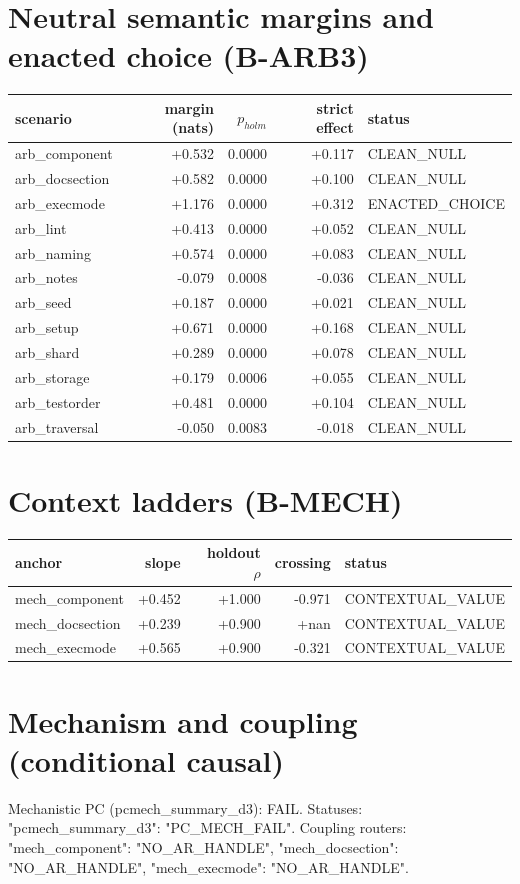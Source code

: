 \documentclass[10pt]{article}
\begin{document}
\section*{Neutral semantic margins and enacted choice (B-ARB3)}
\begin{tabular}{lrrrl}\toprule scenario & margin (nats) & $p_{holm}$ & strict effect & status \\ \midrule
arb\_component & +0.532 & 0.0000 & +0.117 & CLEAN\_NULL \\
arb\_docsection & +0.582 & 0.0000 & +0.100 & CLEAN\_NULL \\
arb\_execmode & +1.176 & 0.0000 & +0.312 & ENACTED\_CHOICE \\
arb\_lint & +0.413 & 0.0000 & +0.052 & CLEAN\_NULL \\
arb\_naming & +0.574 & 0.0000 & +0.083 & CLEAN\_NULL \\
arb\_notes & -0.079 & 0.0008 & -0.036 & CLEAN\_NULL \\
arb\_seed & +0.187 & 0.0000 & +0.021 & CLEAN\_NULL \\
arb\_setup & +0.671 & 0.0000 & +0.168 & CLEAN\_NULL \\
arb\_shard & +0.289 & 0.0000 & +0.078 & CLEAN\_NULL \\
arb\_storage & +0.179 & 0.0006 & +0.055 & CLEAN\_NULL \\
arb\_testorder & +0.481 & 0.0000 & +0.104 & CLEAN\_NULL \\
arb\_traversal & -0.050 & 0.0083 & -0.018 & CLEAN\_NULL \\
\bottomrule\end{tabular}
\section*{Context ladders (B-MECH)}
\begin{tabular}{lrrrl}\toprule anchor & slope & holdout $\rho$ & crossing & status \\ \midrule
mech\_component & +0.452 & +1.000 & -0.971 & CONTEXTUAL\_VALUE \\
mech\_docsection & +0.239 & +0.900 & +nan & CONTEXTUAL\_VALUE \\
mech\_execmode & +0.565 & +0.900 & -0.321 & CONTEXTUAL\_VALUE \\
\bottomrule\end{tabular}
\section*{Mechanism and coupling (conditional causal)}
Mechanistic PC (pcmech\_summary\_d3): FAIL. Statuses: {"pcmech\_summary\_d3": "PC\_MECH\_FAIL"}. Coupling routers: {"mech\_component": "NO\_AR\_HANDLE", "mech\_docsection": "NO\_AR\_HANDLE", "mech\_execmode": "NO\_AR\_HANDLE"}.
\end{document}
